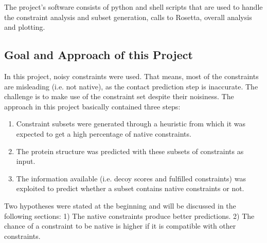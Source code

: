 \documentclass[a4paper, 11pt, parskip=half]{scrartcl}
\begin{document}
The project's software consists of python and shell scripts that are used to
handle the constraint analysis and subset generation,
calls to Rosetta, overall analysis and plotting.

\subsection{Goal and Approach of this Project}
\label{sec:GoalApp}

In this project, noisy constraints were used.
That means, most of the constraints are misleading (i.e. not native),
as the contact prediction step is inaccurate.
The challenge is to make use of the constraint set despite their noisiness.
The approach in this project basically contained three steps:
\begin{enumerate}

	\item Constraint subsets
	were generated through a heuristic from which it was expected to get
	a high percentage of native constraints.

	\item The protein structure was predicted with these subsets of constraints as input.

	\item The information available (i.e. decoy scores and fulfilled constraints)
	was exploited to predict whether a subset
	contains native constraints or not.
\end{enumerate}

Two hypotheses were stated at the beginning and will be discussed in the following sections:
1) The native constraints produce better predictions.
2) The chance of a constraint to be native is higher if it is compatible with other constraints.
\end{document}
